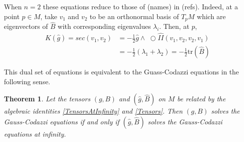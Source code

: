 \documentclass{amsart}
\newcommand{\two}{I\!\!I}
\newcommand{\tr}{\mathrm{tr}}
\newcommand{\wtimes}{\wedge \!\!\!\!\!\!\!\!\;\bigcirc}
\newtheorem{thm}{Theorem}[section]
\begin{document}
When $n = 2$ these equations reduce to those of (names) in (refs).
Indeed, at a point $p \in M$, take $v_1$ and $v_2$ to be an orthonormal basis of $T_pM$ which are eigenvectors of $\hat{B}$ with corresponding eigenvalues $\lambda_i$.
Then, at $p$,
\begin{align*}
K(\hat{g}) 
= sec(v_1,v_2) 
&= -\frac{1}{2}\hat{g}\wtimes \hat{\two}(v_1,v_2,v_2,v_1) \\
&= -\frac{1}{2}( \lambda_1 + \lambda_2)
= -\frac{1}{2}\tr(\hat{B})
\end{align*}


This dual set of equations is equivalent to the Guass-Codazzi equations in the following sense.


\begin{thm}
\label{DualEquations}
Let the tensors $(g,B)$ and $(\hat{g},\hat{B})$ on $M$ be related by the algebraic identities \eqref{TensorsAtInfinity} and \eqref{Tensors}. 
Then $(g,B)$ solves the Gauss-Codazzi equations if and only if $(\hat{g},\hat{B})$ solves the Gauss-Codazzi equations at infinity.
\end{thm}
\end{document}
